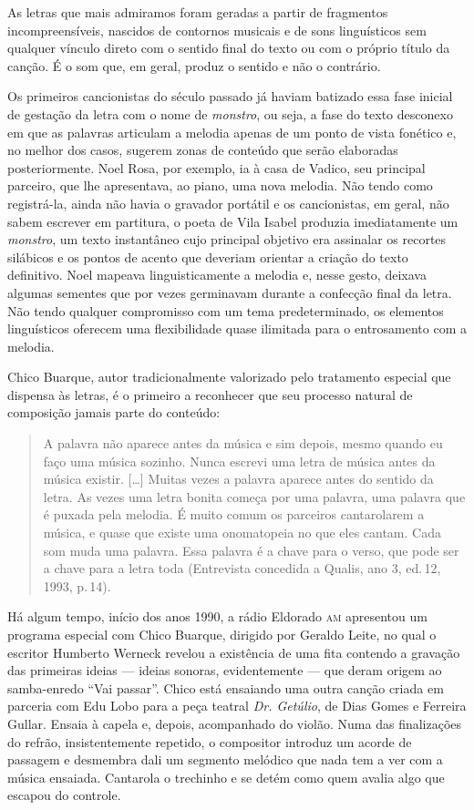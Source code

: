 As letras que mais admiramos foram geradas a partir de fragmentos incompreensíveis, nascidos de contornos musicais e de sons linguísticos
sem qualquer vínculo direto com o sentido final do texto ou com o
próprio título da canção. É o som que, em geral, produz o sentido e não
o contrário.

Os primeiros cancionistas do século passado já haviam batizado essa fase
inicial de gestação da letra com o nome de \textit{monstro}, ou seja, a fase
do texto desconexo em que as palavras articulam a melodia apenas de um
ponto de vista fonético e, no melhor dos casos, sugerem zonas de
conteúdo que serão elaboradas posteriormente. Noel Rosa, por exemplo, ia
à casa de Vadico, seu principal parceiro, que lhe apresentava, ao piano,
uma nova melodia. Não tendo como registrá-la, ainda não havia o gravador
portátil e os cancionistas, em geral, não sabem escrever em partitura,
o poeta de Vila Isabel produzia imediatamente um \textit{monstro}, um texto
instantâneo cujo principal objetivo era assinalar os recortes silábicos
e os pontos de acento que deveriam orientar a criação do texto
definitivo. Noel mapeava linguisticamente a melodia e, nesse gesto,
deixava algumas sementes que por vezes germinavam durante a confecção
final da letra. Não tendo qualquer compromisso com um tema
predeterminado, os elementos linguísticos oferecem uma flexibilidade
quase ilimitada para o entrosamento com a melodia.

Chico Buarque, autor tradicionalmente valorizado pelo tratamento
especial que dispensa às letras, é o primeiro a reconhecer que seu
processo natural de composição jamais parte do conteúdo:

\begin{quote}
A palavra não aparece antes da música e sim depois, mesmo quando eu faço
uma música sozinho. Nunca escrevi uma letra de música antes da música
existir. {[}\ldots{]} Muitas vezes a palavra aparece antes do sentido da
letra. As vezes uma letra bonita começa por uma palavra, uma palavra que
é puxada pela melodia. É muito comum os parceiros cantarolarem a música,
e quase que existe uma onomatopeia no que eles cantam. Cada som muda uma
palavra. Essa palavra é a chave para o verso, que pode ser a chave para
a letra toda (Entrevista concedida a Qualis, ano 3, ed.\,12, 1993, p.\,14).
\end{quote}

Há algum tempo, início dos anos 1990, a rádio Eldorado \textsc{am} apresentou um
programa especial com Chico Buarque, dirigido por Geraldo Leite, no qual
o escritor Humberto Werneck revelou a existência de uma fita contendo a
gravação das primeiras ideias --- ideias sonoras, evidentemente --- que
deram origem ao samba-enredo ``Vai passar''. Chico está ensaiando uma outra
canção criada em parceria com Edu Lobo para a peça teatral \textit{Dr. Getúlio},
de Dias Gomes e Ferreira Gullar. Ensaia à capela e, depois, acompanhado
do violão. Numa das finalizações do refrão, insistentemente repetido, o
compositor introduz um acorde de passagem e desmembra dali um segmento
melódico que nada tem a ver com a música ensaiada. Cantarola o trechinho
e se detém como quem avalia algo que escapou do controle.

